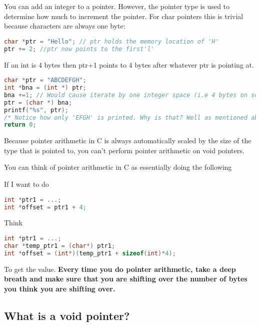 You can add an integer to a pointer. However, the pointer type is used
to determine how much to increment the pointer. For char pointers this
is trivial because characters are always one byte:

\begin{lstlisting}[language=C]
char *ptr = "Hello"; // ptr holds the memory location of 'H'
ptr += 2; //ptr now points to the first'l'
\end{lstlisting}

If an int is 4 bytes then ptr+1 points to 4 bytes after whatever ptr is
pointing at.

\begin{lstlisting}[language=C]
char *ptr = "ABCDEFGH";
int *bna = (int *) ptr;
bna +=1; // Would cause iterate by one integer space (i.e 4 bytes on some systems)
ptr = (char *) bna;
printf("%s", ptr);
/* Notice how only 'EFGH' is printed. Why is that? Well as mentioned above, when performing 'bna+=1' we are increasing the **integer** pointer by 1, (translates to 4 bytes on most systems) which is equivalent to 4 characters (each character is only 1 byte)*/
return 0;
\end{lstlisting}

Because pointer arithmetic in C is always automatically scaled by the
size of the type that is pointed to, you can't perform pointer
arithmetic on void pointers.

You can think of pointer arithmetic in C as essentially doing the
following

If I want to do

\begin{lstlisting}[language=C]
int *ptr1 = ...;
int *offset = ptr1 + 4;
\end{lstlisting}

Think

\begin{lstlisting}[language=C]
int *ptr1 = ...;
char *temp_ptr1 = (char*) ptr1;
int *offset = (int*)(temp_ptr1 + sizeof(int)*4);
\end{lstlisting}

To get the value. \textbf{Every time you do pointer arithmetic, take a
	deep breath and make sure that you are shifting over the number of bytes
	you think you are shifting over.}

\subsection{What is a void pointer?}

